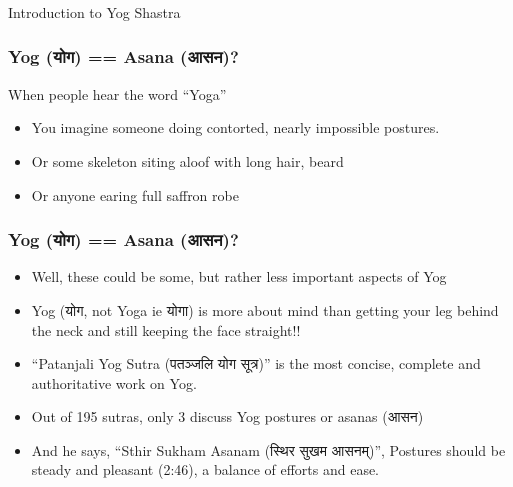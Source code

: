 \begin{frame}[fragile]\frametitle{}
\begin{center}
{\Large Introduction to Yog Shastra}
\end{center}
\end{frame}

\begin{frame}[fragile]\frametitle{Yog (योग) == Asana (आसन)?}
When people hear the word ``Yoga''

	\begin{itemize}
	\item You imagine someone doing contorted, nearly impossible postures.
	\item Or some skeleton siting aloof with long hair, beard
	\item Or anyone earing full saffron robe
	\end{itemize}

\end{frame}

\begin{frame}[fragile]\frametitle{Yog (योग) == Asana (आसन)?}

	\begin{itemize}
	\item Well, these could be some, but rather less important aspects of Yog
	\item Yog (योग, not Yoga ie योगा) is more about mind than getting your leg behind the neck and still keeping the face straight!!
	\item ``Patanjali Yog Sutra (पतञ्जलि योग सूत्र)'' is the most concise, complete and authoritative work on Yog.
	\item Out of 195 sutras, only 3 discuss Yog postures or asanas (आसन)
	\item And he says, ``Sthir Sukham Asanam (स्थिर सुखम आसनम्)'', Postures should be steady and pleasant (2:46), a balance of efforts and ease.
	\end{itemize}

\end{frame}


